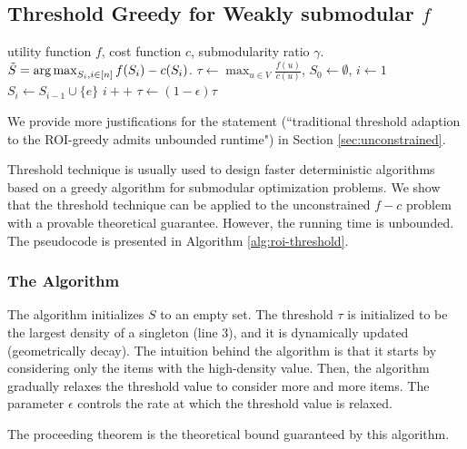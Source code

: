 \documentclass[10pt]{article} %
\DeclareMathOperator*{\argmax}{arg\,max}
\theoremstyle{remark}
\begin{document}
\subsection{Threshold Greedy for Weakly submodular $f$}
\label{sec:modified-thresh}
\begin{algorithm}[tb]
   \caption{\textsc{threshold-ROI}($f, c, \gamma$)}
   \label{alg:roi-threshold}
\begin{algorithmic}[1]
    utility function $f$, cost function $c$, submodularity ratio $\gamma$.
    $\Tilde{S} = \argmax_{S_i, i \in [n]} f(S_i)-c(S_i)$.
   \vspace{.05in}
   \STATE $\tau \gets \max_{u \in V}\frac{f(u)}{c(u)}$, $S_0 \gets \emptyset$, $i \gets 1$
    \WHILE{$\tau > \gamma$}
    \STATE $S_i \gets S_{i-1} \cup \{e\}$
    \STATE $i++$
    \ENDIF
    \ENDFOR
    \STATE $\tau \gets (1-\epsilon) \tau$
    \ENDWHILE
\end{algorithmic}
\end{algorithm}

We provide more justifications for the statement (``traditional threshold adaption to the ROI-greedy admits unbounded runtime") in Section \ref{sec:unconstrained}. 

Threshold technique \cite{badanidiyuru2014fast} is usually used to design faster deterministic algorithms based on a greedy algorithm for submodular optimization problems. We show that the threshold technique can be applied to the unconstrained $f-c$ problem with a provable theoretical guarantee. However, the running time is unbounded. The pseudocode is presented in Algorithm \ref{alg:roi-threshold}.

\subsubsection{The Algorithm}
The algorithm initializes $S$ to an empty set. The threshold $\tau$ is initialized to be the largest density of a singleton (line 3), and it is dynamically updated (geometrically decay). The intuition behind the algorithm is that it starts by considering only the items with the high-density value. Then, the algorithm gradually relaxes the threshold value to consider more and more items. The parameter $\epsilon$ controls the rate at which the threshold value is relaxed.

The proceeding theorem is the theoretical bound guaranteed by this algorithm. 
\end{document}
